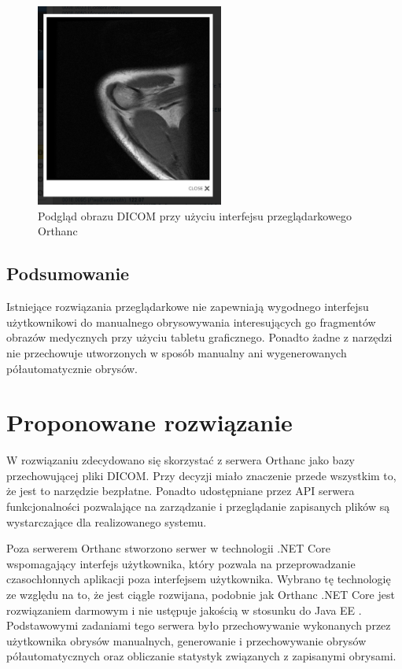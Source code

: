 \documentclass[a4paper,11pt,twoside,openright]{report}
\theoremstyle{definition}
\begin{document}
\begin{figure}[tb!]
	\center
	\includegraphics[width=0.55\textwidth]{Orthanc-preview}
	\caption{Podgląd obrazu DICOM przy użyciu interfejsu przeglądarkowego Orthanc}
    	\label{fig:Orthanc-preview}
\end{figure}


\subsection {Podsumowanie}

Istniejące rozwiązania przeglądarkowe nie zapewniają wygodnego interfejsu użytkownikowi
do manualnego obrysowywania interesujących go fragmentów obrazów medycznych przy użyciu tabletu graficznego.
Ponadto żadne z narzędzi nie przechowuje utworzonych w sposób manualny
ani wygenerowanych półautomatycznie obrysów.

\section {Proponowane rozwiązanie}

W rozwiązaniu zdecydowano się skorzystać z serwera Orthanc jako bazy przechowującej
pliki DICOM. Przy decyzji miało znaczenie przede wszystkim to, że jest to narzędzie
bezpłatne. Ponadto udostępniane przez API serwera funkcjonalności pozwalające na
zarządzanie i przeglądanie zapisanych plików są wystarczające dla realizowanego systemu.

Poza serwerem Orthanc stworzono serwer w technologii .NET Core \cite{Dotnet}
wspomagający interfejs użytkownika, który pozwala na przeprowadzanie czasochłonnych
aplikacji poza interfejsem użytkownika. Wybrano tę technologię ze względu na to,
że jest ciągle rozwijana, podobnie jak Orthanc .NET Core jest rozwiązaniem darmowym
i nie ustępuje jakością w stosunku do Java EE \cite{Dlaczego dotnet}.
Podstawowymi zadaniami tego serwera było przechowywanie
wykonanych przez użytkownika obrysów manualnych, generowanie i przechowywanie
obrysów półautomatycznych oraz obliczanie statystyk związanych z zapisanymi obrysami.
\end{document}

